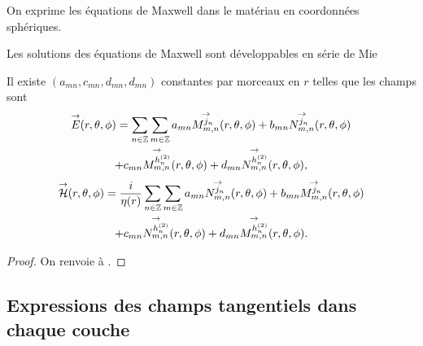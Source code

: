     On exprime les équations de Maxwell dans le matériau en coordonnées sphériques.

    Les solutions des équations de Maxwell sont développables en série de Mie
    \begin{prop}
        Il existe \((a_{mn},c_{mn},d_{mn},d_{mn})\) constantes par morceaux en \(r\) telles que les champs sont
        \begin{multline*}
            \vE(\rtp) = \sum_{n\in\ZZ}\sum_{m\in\ZZ} a_{mn} \Mmn[j_n](\rtp) + b_{mn} \Nmn[j_n](\rtp)
            \\
            + c_{mn} \Mmn[h^{(2)}_n](\rtp) + d_{mn} \Nmn[h^{(2)}_n](\rtp),
        \end{multline*}
        \begin{multline*}
            \vH(\rtp) = \frac{i}{\eta(r)}\sum_{n\in\ZZ}\sum_{m\in\ZZ} a_{mn} \Nmn[j_n](\rtp) + b_{mn} \Mmn[j_n](\rtp)
            \\
            + c_{mn} \Nmn[h^{(2)}_n](\rtp) + d_{mn} \Mmn[h^{(2)}_n](\rtp).
        \end{multline*}
    \end{prop}
    \begin{proof}
        On renvoie à \cite{cheng_spectral_1993}.
    \end{proof}

  \subsection{Expressions des champs tangentiels dans chaque couche}


